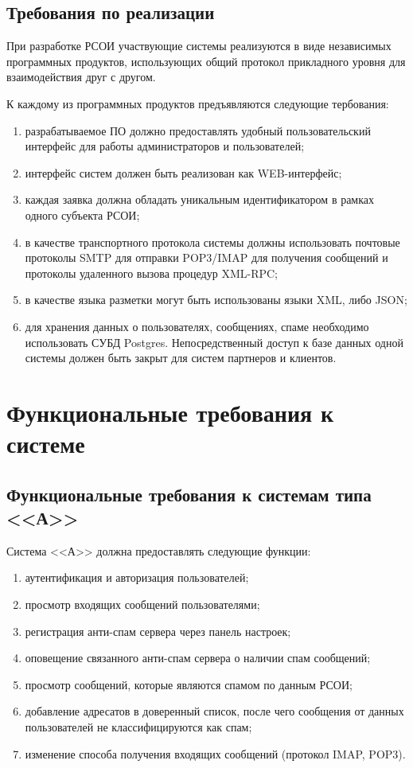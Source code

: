  \subsection{Требования по реализации}
 При разработке РСОИ участвующие системы реализуются в виде независимых программных продуктов, использующих общий протокол прикладного уровня для взаимодействия друг с другом. 

 К каждому из программных продуктов предъявляются следующие тербования:
 \begin{enumerate}
 	\item разрабатываемое ПО должно предоставлять удобный пользовательский интерфейс для работы администраторов и пользователей;
 	\item интерфейс систем должен быть реализован как WEB-интерфейс;
 	\item каждая заявка должна обладать уникальным идентификатором в рамках одного субъекта РСОИ;
 	\item в качестве транспортного протокола системы должны использовать почтовые протоколы SMTP для отправки POP3/IMAP для получения сообщений и протоколы удаленного вызова процедур XML-RPC;
 	\item в качестве языка разметки могут быть использованы языки XML, либо JSON;
 	\item для хранения данных о пользователях, сообщениях, спаме необходимо использовать СУБД Postgres. Непосредственный доступ к базе данных одной системы должен быть закрыт для систем партнеров и клиентов.
 \end{enumerate}


\section{Функциональные требования к системе}
\subsection{Функциональные требования к системам типа <<А>>}
Система <<А>> должна предоставлять следующие функции:
\begin{enumerate}
	\item аутентификация и авторизация пользователей;
	\item просмотр входящих сообщений пользователями;
	\item регистрация анти-спам сервера через панель настроек;
	\item оповещение связанного анти-спам сервера о наличии спам сообщений;
	\item просмотр сообщений, которые являются спамом по данным РСОИ;
	\item добавление адресатов в доверенный список, после чего сообщения от данных пользователей не классифицируются как спам;
	\item изменение способа получения входящих сообщений (протокол IMAP, POP3).
\end{enumerate}



